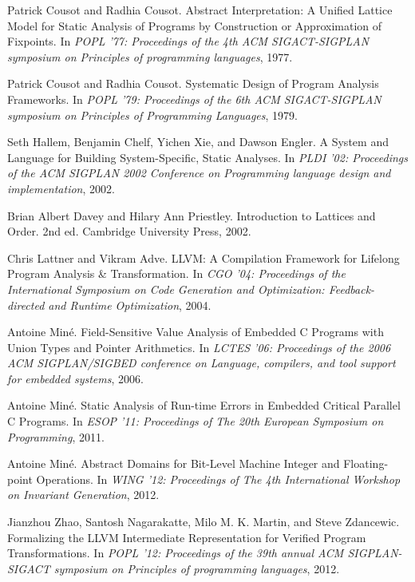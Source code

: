 \documentclass[a4paper]{book}
\begin{document}
\cleardoublepage
{}
\begin{thebibliography}{9}

 Patrick Cousot and Radhia Cousot.  Abstract
  Interpretation: A Unified Lattice Model for Static Analysis of
  Programs by Construction or Approximation of Fixpoints.  In
  \emph{POPL '77: Proceedings of the 4th ACM SIGACT-SIGPLAN symposium
    on Principles of programming languages}, 1977.

 Patrick Cousot and Radhia Cousot.  Systematic Design of
  Program Analysis Frameworks.  In \emph{POPL '79: Proceedings of the
    6th ACM SIGACT-SIGPLAN symposium on Principles of Programming
    Languages}, 1979.

 Seth Hallem, Benjamin Chelf, Yichen Xie, and Dawson
  Engler.  A System and Language for Building System-Specific, Static
  Analyses.  In \emph{PLDI '02: Proceedings of the ACM SIGPLAN 2002
    Conference on Programming language design and implementation},
  2002.

 Brian Albert Davey and Hilary Ann
  Priestley. Introduction to Lattices and Order. 2nd ed. Cambridge
  University Press, 2002.

 Chris Lattner and Vikram Adve.  LLVM: A Compilation
  Framework for Lifelong Program Analysis \& Transformation. In
  \emph{CGO '04: Proceedings of the International Symposium on Code
    Generation and Optimization: Feedback-directed and Runtime
    Optimization}, 2004.

 Antoine Miné.  Field-Sensitive Value Analysis of
  Embedded C Programs with Union Types and Pointer Arithmetics.  In
  \emph{LCTES '06: Proceedings of the 2006 ACM SIGPLAN/SIGBED
    conference on Language, compilers, and tool support for embedded
    systems}, 2006.

 Antoine Miné.  Static Analysis of Run-time Errors in
  Embedded Critical Parallel C Programs.  In \emph{ESOP '11:
    Proceedings of The 20th European Symposium on Programming}, 2011.

 Antoine Miné.  Abstract Domains for Bit-Level Machine
  Integer and Floating-point Operations.  In \emph{WING '12:
    Proceedings of The 4th International Workshop on Invariant
    Generation}, 2012.

 Jianzhou Zhao, Santosh Nagarakatte, Milo
  M. K. Martin, and Steve Zdancewic.  Formalizing the LLVM
  Intermediate Representation for Verified Program Transformations. In
  \emph{POPL '12: Proceedings of the 39th annual ACM SIGPLAN-SIGACT
    symposium on Principles of programming languages}, 2012.

\end{thebibliography}

\clearpage
{}
\printindex
\end{document}
